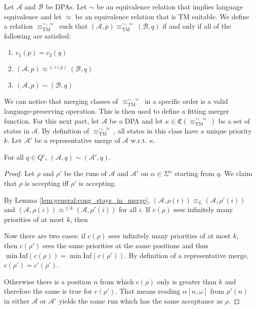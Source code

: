 \vspace{25pt}

\begin{defn}
	Let $\mathcal{A}$ and $\mathcal{B}$ be DPAs. Let $\sim$ be an equivalence relation that implies language equivalence and let $\approx$ be an equivalence relation that is TM suitable. We define a relation $\equiv_\text{TM}^{\sim, \approx}$ such that $(\mathcal{A}, p) \equiv^{\sim, \approx}_\text{TM} (\mathcal{B}, q)$ if and only if all of the following are satisfied:
	\begin{enumerate}
		\item $c_1(p) = c_2(q)$
		\item $(\mathcal{A}, p) \approx^{\leq c(p)} (\mathcal{B}, q)$
		\item $(\mathcal{A}, p) \sim (\mathcal{B}, q)$
	\end{enumerate}
\end{defn}


We can notice that merging classes of $\equiv_\text{TM}^{\sim, \approx}$ in a specific order is a valid language-preserving operation. This is then used to define a fitting merger function. For this next part, let $\mathcal{A}$ be a DPA and let $\kappa \in \mathfrak{C}(\equiv^{\sim, \approx}_\text{TM})$ be a set of states in $\mathcal{A}$. By definition of $\equiv^{\sim, \approx}_\text{TM}$, all states in this class have a unique priority $k$. Let $\mathcal{A}'$ be a representative merge of $\mathcal{A}$ w.r.t. $\kappa$.

\begin{lem}
	For all $q \in Q'$, $(\mathcal{A}, q) \sim (\mathcal{A}', q)$.
	\label{lem:tremoore:merge_keep_sim}
\end{lem}

\begin{proof} 
	Let $\rho$ and $\rho'$ be the runs of $\mathcal{A}$ and $\mathcal{A}'$ on $\alpha \in \Sigma^\omega$ starting from $q$. We claim that $\rho$ is accepting iff $\rho'$ is accepting.
	
	By Lemma \ref{lem:general:cong_stays_in_merge}, $(\mathcal{A}, \rho(i)) \equiv_L (\mathcal{A}, \rho'(i))$ and $(\mathcal{A}, \rho(i)) \approx^{\leq k} (\mathcal{A}, \rho'(i))$ for all $i$. If $c(\rho)$ sees infinitely many priorities of at most $k$, then %
	
	 Now there are two cases: if $c(\rho)$ sees infinitely many priorities of at most $k$, then $c(\rho')$ sees the same priorities at the same positions and thus $\min \text{Inf}(c(\rho)) = \min \text{Inf}(c(\rho'))$. By definition of a representative merge, $c(\rho') = c'(\rho')$.
	
	 Otherwise there is a position $n$ from which $c(\rho)$ only is greater than $k$ and therefore the same is true for $c(\rho')$. That means reading $\alpha[n,\omega]$ from $\rho'(n)$ in either $\mathcal{A}$ or $\mathcal{A}'$ yields the same run which has the same acceptance as $\rho$.
\end{proof}

